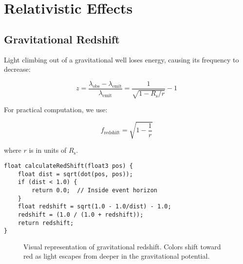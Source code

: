 \documentclass[12pt,a4paper]{article}
\theoremstyle{definition}
\theoremstyle{remark}
\newcommand{\Rs}{R_{\text{s}}}
\begin{document}
\section{Relativistic Effects}

\subsection{Gravitational Redshift}

Light climbing out of a gravitational well loses energy, causing its frequency to decrease:

\begin{equation}
    z = \frac{\lambda_{\text{obs}} - \lambda_{\text{emit}}}{\lambda_{\text{emit}}} = \frac{1}{\sqrt{1 - \Rs/r}} - 1
\end{equation}

For practical computation, we use:

\begin{equation}
    f_{\text{redshift}} = \sqrt{1 - \frac{1}{r}}
\end{equation}

where $r$ is in units of $\Rs$.

\begin{lstlisting}[style=metalstyle, caption=Gravitational redshift calculation]
float calculateRedShift(float3 pos) {
    float dist = sqrt(dot(pos, pos));
    if (dist < 1.0) {
        return 0.0;  // Inside event horizon
    }
    float redshift = sqrt(1.0 - 1.0/dist) - 1.0;
    redshift = (1.0 / (1.0 + redshift));
    return redshift;
}
\end{lstlisting}

\begin{figure}[H]
    \centering
    \caption{Visual representation of gravitational redshift. Colors shift toward red as light escapes from deeper in the gravitational potential.}
    \label{fig:redshift_visualization}
\end{figure}
\end{document}

